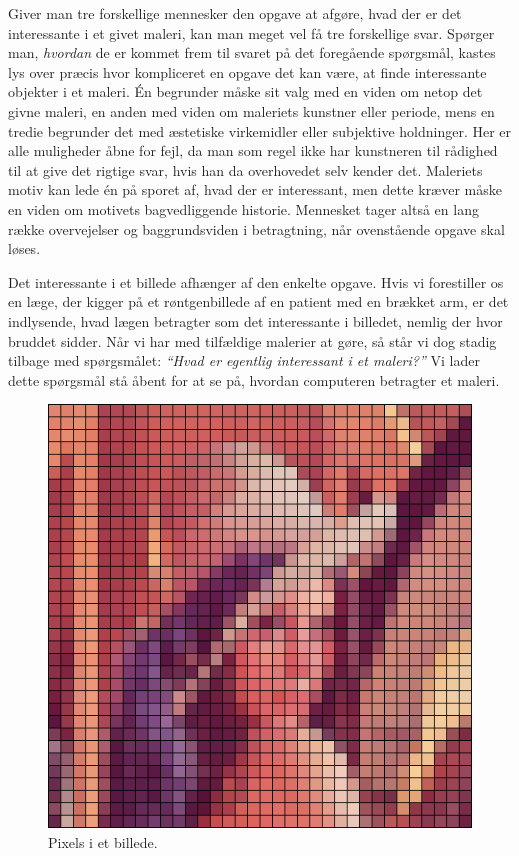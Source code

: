 {
Giver man tre forskellige mennesker den opgave at afgøre, hvad der er
det interessante i et givet maleri, kan man meget vel få tre forskellige
svar. Spørger man, \emph{hvordan} de er kommet frem til svaret på det
foregående spørgsmål, kastes lys over præcis hvor kompliceret en opgave
det kan være, at finde interessante objekter i et maleri. Én begrunder
måske sit valg med en viden om netop det givne maleri, en anden med
viden om maleriets kunstner eller periode, mens en tredie begrunder det
med æstetiske virkemidler eller subjektive holdninger. Her er alle
muligheder åbne for fejl, da man som regel ikke har kunstneren til
rådighed til at give det rigtige svar, hvis han da overhovedet selv
kender det.  Maleriets motiv kan lede én på sporet af, hvad der er
interessant, men dette kræver måske en viden om motivets bagvedliggende
historie.  Mennesket tager altså en lang række overvejelser og
baggrundsviden i betragtning, når ovenstående opgave skal løses.

Det interessante i et billede afhænger af den enkelte opgave.  Hvis vi
forestiller os en læge, der kigger på et røntgenbillede af en patient
med en brækket arm, er det indlysende, hvad lægen betragter som det
interessante i billedet, nemlig der hvor bruddet sidder. Når vi har med
tilfældige malerier at gøre, så står vi dog stadig tilbage med
spørgsmålet: \emph{``Hvad er egentlig \emph{interessant} i et maleri?''}
Vi lader dette spørgsmål stå åbent for at se på, hvordan computeren
betragter et maleri.

\begin{figure}[b]
    \centering
    \includegraphics[scale=0.3]{afsnit/baggrund/billeder/pixel_lena}
    \caption[]{Pixels i et billede.}
    \label{pixel_lena}
\end{figure}

}
